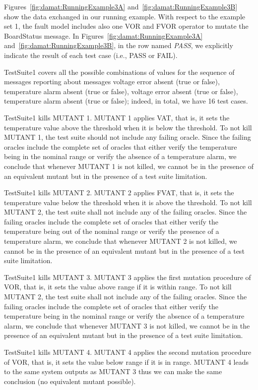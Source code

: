 Figures~\ref{fig:damat:RunningExample3A} and~\ref{fig:damat:RunningExample3B} show the data exchanged in our running example. With respect to the example set 1, the fault model includes also one VOR and FVOR operator to mutate the BoardStatus message. In Figures~\ref{fig:damat:RunningExample3A} and~\ref{fig:damat:RunningExample3B}, in the row named \emph{PASS}, we explicitly indicate the result of each test case (i.e., PASS or FAIL).

TestSuite1 covers all the possible combinations of values for the sequence of messages reporting about messages voltage error absent (true or false), temperature alarm absent (true or false), voltage error absent (true or false), temperature alarm absent (true or false); indeed, in total, we have 16 test cases.

TestSuite1 kills MUTANT 1. MUTANT 1 applies VAT, that is, it sets the temperature value above the threshold when it is below the threshold. To not kill MUTANT 1, the test suite should not include any failing oracle. Since the failing oracles include the complete set of oracles that either verify the temperature being in the nominal range or verify the absence of a temperature alarm, we conclude that whenever MUTANT 1 is not killed, we cannot be in the presence of an equivalent mutant but in the presence of a test suite limitation.

TestSuite1 kills MUTANT 2. MUTANT 2 applies FVAT, that is, it sets the temperature value below the threshold when it is above the threshold. To not kill MUTANT 2, the test suite shall not include any of the failing oracles. Since the failing oracles include the complete set of oracles that either verify the temperature being out of the nominal range or verify the presence of a temperature alarm, we conclude that whenever MUTANT 2 is not killed, we cannot be in the presence of an equivalent mutant but in the presence of a test suite limitation.

TestSuite1 kills MUTANT 3. MUTANT 3 applies the first mutation procedure of VOR, that is, it sets the value above range if it is within range. To not kill MUTANT 2, the test suite shall not include any of the failing oracles. Since the failing oracles include the complete set of oracles that either verify the temperature being in the nominal range or verify the absence of a temperature alarm, we conclude that whenever MUTANT 3 is not killed, we cannot be in the presence of an equivalent mutant but in the presence of a test suite limitation.

TestSuite1 kills MUTANT 4. MUTANT 4 applies the second mutation procedure of VOR, that is, it sets the value below range if it is in range. MUTANT 4 leads to the same system outputs as MUTANT 3 thus we can make the same conclusion (no equivalent mutant possible).

